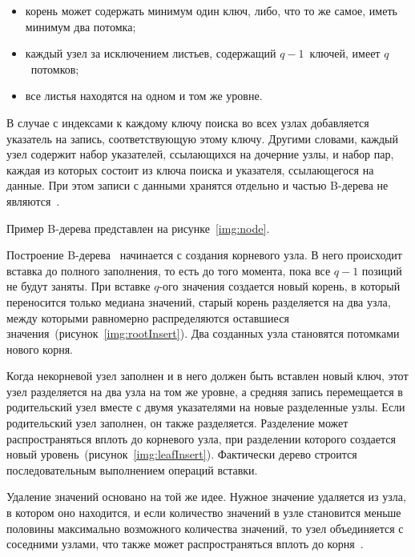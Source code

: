 \begin{itemize}
    \item корень может содержать минимум один ключ, либо, что то же самое, иметь
        минимум два потомка;

    \item каждый узел за исключением листьев, содержащий $q-1$~ключей, имеет
        $q$~потомков;

    \item все листья находятся на одном и том же уровне.
\end{itemize}

В случае с индексами к каждому ключу поиска во всех узлах добавляется указатель
на запись, соответствующую этому ключу. Другими словами, каждый узел содержит
набор указателей, ссылающихся на дочерние узлы, и набор пар, каждая из которых
состоит из ключа поиска и указателя, ссылающегося на данные. При этом записи с
данными хранятся отдельно и частью B-дерева не являются~\cite{arki}.

Пример B-дерева представлен на рисунке~\ref{img:node}.
~\\


Построение B-дерева~\cite{flatfish} начинается с создания корневого узла. В него
происходит вставка до полного заполнения, то есть до того момента, пока все
$q-1$ позиций не будут заняты. При вставке $q$-ого значения создается новый
корень, в который переносится только медиана значений, старый корень разделяется
на два узла, между которыми равномерно распределяются оставшиеся
значения~(рисунок~\ref{img:rootInsert}). Два созданных узла становятся потомками
нового корня.


Когда некорневой узел заполнен и в него должен быть вставлен новый ключ, этот
узел разделяется на два узла на том же уровне, а средняя запись перемещается в
родительский узел вместе с двумя указателями на новые разделенные узлы. Если
родительский узел заполнен, он также разделяется. Разделение может
распространяться вплоть до корневого узла, при разделении которого создается
новый уровень~(рисунок~\ref{img:leafInsert}). Фактически дерево строится
последовательным выполнением операций вставки.


Удаление значений основано на той же идее. Нужное значение удаляется из узла, в
котором оно находится, и если количество значений в узле становится меньше
половины максимально возможного количества значений, то узел объединяется с
соседними узлами, что также может распространяться вплоть до корня~\cite{marvel}. 

